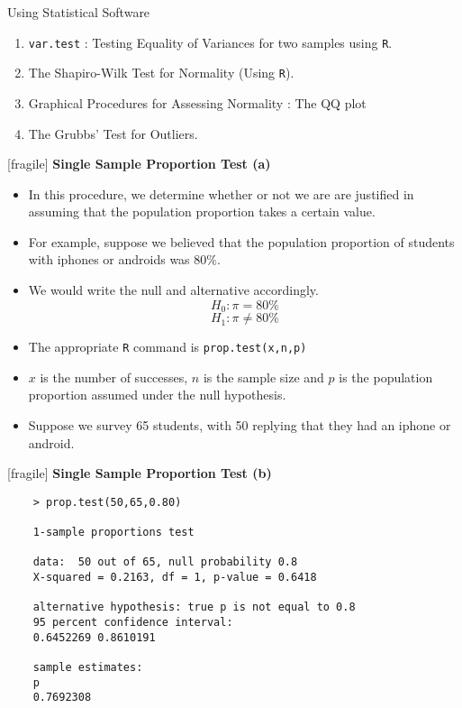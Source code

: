 \documentclass[]{report}
\begin{document}
\newpage		
	
	Using Statistical Software
	\begin{enumerate}
		\item \texttt{var.test} : Testing Equality of Variances for two samples using \texttt{R}.
		\item The Shapiro-Wilk Test for Normality (Using \texttt{R}).
		\item Graphical Procedures for Assessing Normality : The QQ plot
		\item The Grubbs' Test for Outliers.
	\end{enumerate}
	
	
	
	

	
	
	[fragile]
	\textbf{Single Sample Proportion Test (a)}
	\begin{itemize}
		\item In this procedure, we determine whether or not we are are justified in assuming that the population proportion takes a certain value.
		\item For example, suppose we believed that the population proportion of students with iphones or androids was $80\%$.
		\item We would write the null and alternative accordingly.
		\[H_0 : \pi = 80\% \]
		\[H_1 : \pi \neq 80\% \]
		\item The  appropriate \texttt{R} command is \texttt{prop.test(x,n,p)}
		\item $x$ is the number of successes, $n$ is the sample size and $p$ is the population proportion assumed under the null hypothesis.
		\item Suppose we survey 65 students, with 50 replying that they had an iphone or android.
	\end{itemize}
	
	
	
	[fragile]
	\textbf{Single Sample Proportion Test (b)}
	\begin{verbatim}
	> prop.test(50,65,0.80)
	
	1-sample proportions test
	
	data:  50 out of 65, null probability 0.8
	X-squared = 0.2163, df = 1, p-value = 0.6418
	
	alternative hypothesis: true p is not equal to 0.8
	95 percent confidence interval:
	0.6452269 0.8610191
	
	sample estimates:
	p
	0.7692308
	\end{verbatim}
	
\end{document}
